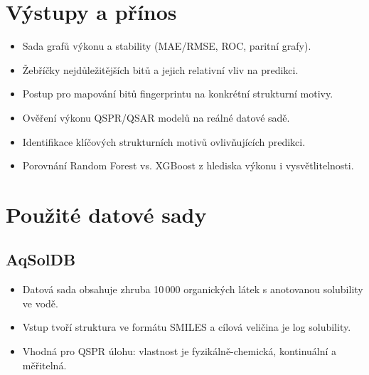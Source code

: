 \documentclass[12pt]{article}
\begin{document}
\section*{Výstupy a přínos}
\begin{itemize}
  \item Sada grafů výkonu a stability (MAE/RMSE, ROC, paritní grafy).
  \item Žebříčky nejdůležitějších bitů a jejich relativní vliv na predikci.
  \item Postup pro mapování bitů fingerprintu na konkrétní strukturní motivy.
  \item Ověření výkonu QSPR/QSAR modelů na reálné datové sadě.
  \item Identifikace klíčových strukturních motivů ovlivňujících predikci.
  \item Porovnání Random Forest vs. XGBoost z hlediska výkonu i vysvětlitelnosti.
\end{itemize}
\begin{abstract}
  \begin{itemize}
    \item QSPR a QSAR regresní modely se využívají pro predikci fyzikálně-chemických vlastností a biologické aktivity látek.
    \item V praxi snižují náklady na experimentální měření (např. ve farmaceutickém výzkumu).
    \item Přesnost moderních modelů je vysoká, ale jejich rozhodování bývá málo interpretovatelné.
    \item Interpretace pomocí SHAP a Boruta-SHAP ukazuje, které strukturní motivy mají největší vliv na predikci.
  \end{itemize}
\end{abstract}
\newpage

\section{Použité datové sady}
\subsection{AqSolDB}
\begin{itemize}
  \item Datová sada obsahuje zhruba 10\,000 organických látek s anotovanou solubility ve vodě.
  \item Vstup tvoří struktura ve formátu SMILES a cílová veličina je log solubility.
  \item Vhodná pro QSPR úlohu: vlastnost je fyzikálně-chemická, kontinuální a měřitelná.
\end{itemize}
\end{document}
